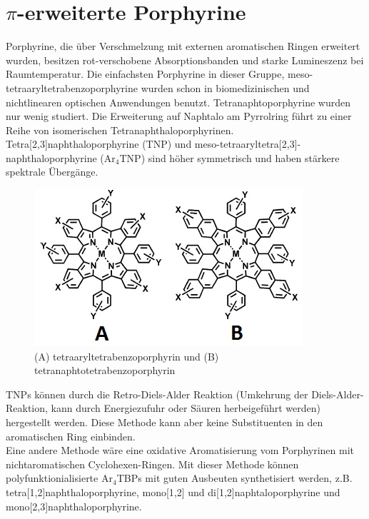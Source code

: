 \section{$\pi$-erweiterte Porphyrine}
Porphyrine, die über Verschmelzung mit externen aromatischen Ringen erweitert wurden, besitzen rot-verschobene Absorptionsbanden und starke Lumineszenz bei Raumtemperatur. Die einfachsten Porphyrine in dieser Gruppe, meso-tetraaryltetrabenzoporphyrine wurden schon in biomedizinischen und nichtlinearen optischen Anwendungen benutzt. Tetranaphtoporphyrine wurden nur wenig studiert. Die Erweiterung auf Naphtalo am Pyrrolring führt zu einer Reihe von isomerischen Tetranaphthaloporphyrinen. Tetra[2,3]naphthaloporphyrine (TNP) und meso-tetraaryltetra[2,3]-naphthaloporphyrine (Ar$_4$TNP) sind höher symmetrisch und haben stärkere spektrale Übergänge.
\begin{figure}[!htbp]
\centering
\includegraphics[scale=1]{graphics/MAr4TBP}
\caption{(A) tetraaryltetrabenzoporphyrin und (B) tetranaphtotetrabenzoporphyrin}
\end{figure}
TNPs können durch die Retro-Diels-Alder Reaktion (Umkehrung der Diels-Alder-Reaktion, kann durch Energiezufuhr oder Säuren herbeigeführt werden) hergestellt werden. Diese Methode kann aber keine Substituenten in den aromatischen Ring einbinden.
\\Eine andere Methode wäre eine oxidative Aromatisierung vom Porphyrinen mit nichtaromatischen Cyclohexen-Ringen. Mit dieser Methode können polyfunktionialisierte Ar$_4$TBPs mit guten Ausbeuten synthetisiert werden, z.B. tetra[1,2]naphthaloporphyrine, mono[1,2] und di[1,2]naphtaloporphyrine und mono[2,3]naphthaloporphyrine. \cite{[10]}

